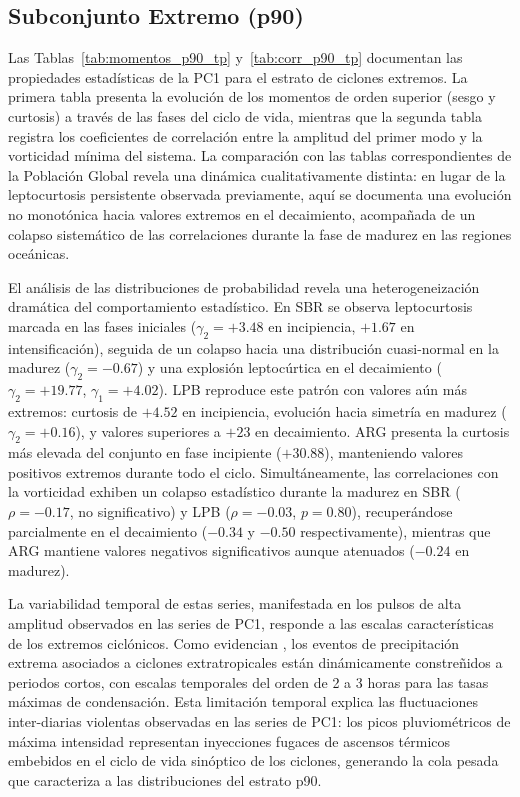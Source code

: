 % 
\subsection{Subconjunto Extremo (p90)}\label{subsubsec:pc1_p90_tp}



Las Tablas~\ref{tab:momentos_p90_tp} y~\ref{tab:corr_p90_tp} documentan las propiedades estadísticas de la PC1 para el estrato de ciclones extremos. La primera tabla presenta la evolución de los momentos de orden superior (sesgo y curtosis) a través de las fases del ciclo de vida, mientras que la segunda tabla registra los coeficientes de correlación entre la amplitud del primer modo y la vorticidad mínima del sistema. La comparación con las tablas correspondientes de la Población Global revela una dinámica cualitativamente distinta: en lugar de la leptocurtosis persistente observada previamente, aquí se documenta una evolución no monotónica hacia valores extremos en el decaimiento, acompañada de un colapso sistemático de las correlaciones durante la fase de madurez en las regiones oceánicas.

El análisis de las distribuciones de probabilidad revela una heterogeneización dramática del comportamiento estadístico. En SBR se observa leptocurtosis marcada en las fases iniciales ($\gamma_2 = +3.48$ en incipiencia, $+1.67$ en intensificación), seguida de un colapso hacia una distribución cuasi-normal en la madurez ($\gamma_2 = -0.67$) y una explosión leptocúrtica en el decaimiento ($\gamma_2 = +19.77$, $\gamma_1 = +4.02$). LPB reproduce este patrón con valores aún más extremos: curtosis de $+4.52$ en incipiencia, evolución hacia simetría en madurez ($\gamma_2 = +0.16$), y valores superiores a $+23$ en decaimiento. ARG presenta la curtosis más elevada del conjunto en fase incipiente ($+30.88$), manteniendo valores positivos extremos durante todo el ciclo. Simultáneamente, las correlaciones con la vorticidad exhiben un colapso estadístico durante la madurez en SBR ($\rho = -0.17$, no significativo) y LPB ($\rho = -0.03$, $p = 0.80$), recuperándose parcialmente en el decaimiento ($-0.34$ y $-0.50$ respectivamente), mientras que ARG mantiene valores negativos significativos aunque atenuados ($-0.24$ en madurez).

La variabilidad temporal de estas series, manifestada en los pulsos de alta amplitud observados en las series de PC1, responde a las escalas características de los extremos ciclónicos. Como evidencian \citet{chen2025characteristics}, los eventos de precipitación extrema asociados a ciclones extratropicales están dinámicamente constreñidos a periodos cortos, con escalas temporales del orden de 2 a 3 horas para las tasas máximas de condensación. Esta limitación temporal explica las fluctuaciones inter-diarias violentas observadas en las series de PC1: los picos pluviométricos de máxima intensidad representan inyecciones fugaces de ascensos térmicos embebidos en el ciclo de vida sinóptico de los ciclones, generando la cola pesada que caracteriza a las distribuciones del estrato p90.

